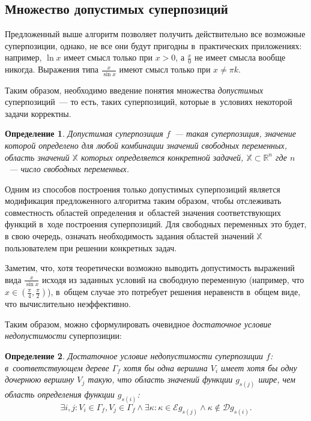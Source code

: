 \documentclass[12pt,a4paper]{article}
\newtheorem{defin}{Определение}
\begin{document}
\subsection{Множество допустимых суперпозиций}

Предложенный выше алгоритм позволяет получить действительно все возможные
суперпозиции, однако, не все они будут пригодны в~практических приложениях:
например, $\ln x$ имеет смысл только при $x > 0$, а $\frac{x}{0}$ не имеет
смысла вообще никогда. Выражения типа $\frac{x}{\sin x}$ имеют смысл только
при $x \neq \pi k$.

Таким образом, необходимо введение понятия множества \emph{допустимых}
суперпозиций~--- то есть, таких суперпозиций, которые в~условиях некоторой
задачи корректны.

\begin{defin}
  Допустимая суперпозиция $f$~--- такая суперпозиция, значение которой
  определено для любой комбинации значений свободных переменных, область
  значений $\mathbb{X}$ которых определяется конкретной задачей,
  $\mathbb{X} \subset \mathbb{R}^n$ где $n$~--- число свободных переменных.
\end{defin}

Одним из способов построения только допустимых суперпозиций является
модификация предложенного алгоритма таким образом, чтобы отслеживать
совместность областей определения и~областей значения соответствующих
функций в~ходе построения суперпозиций. Для свободных переменных это будет,
в свою очередь, означать необходимость задания областей значений
$\mathbb{X}$ пользователем при решении конкретных задач.

Заметим, что, хотя теоретически возможно выводить допустимость выражений
вида $\frac{x}{\sin x}$ исходя из заданных условий на свободную переменную
(например, что $x \in (\frac{\pi}{4}, \frac{\pi}{2})$), в~общем случае это
потребует решения неравенств в~общем виде, что вычислительно неэффективно.

Таким образом, можно сформулировать очевидное \emph{достаточное условие
недопустимости} суперпозиции:

\begin{defin}
  Достаточное условие недопустимости суперпозиции $f$: в~соответствующем дереве
  $\Gamma_f$ хотя бы одна вершина $V_i$ имеет хотя бы одну дочернюю вершину
  $V_j$ такую, что область значений функции $g_{s(j)}$ шире, чем область
  определения функции $g_{s(i)}$:
  \[
  \exists i, j : V_i \in \Gamma_f, V_j \in \Gamma_f \wedge \exists \kappa :
	\kappa \in \mathcal{E} g_{s(j)} \wedge \kappa \notin \mathcal{D} g_{s(i)}.
  \]
\end{defin}
\end{document}
